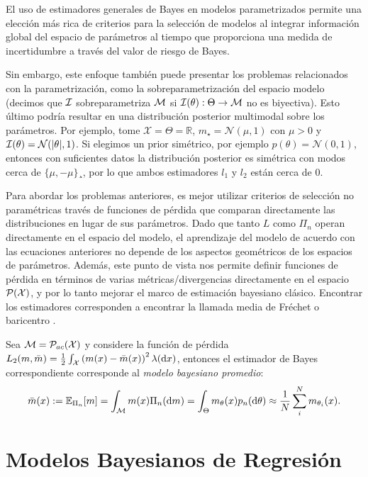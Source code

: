 El uso de estimadores generales de Bayes en modelos parametrizados permite una elección más rica de criterios para la selección de modelos al integrar información global del espacio de parámetros al tiempo que proporciona una medida de incertidumbre a través del valor de riesgo de Bayes. 

Sin embargo, este enfoque también puede presentar los problemas relacionados con la parametrización, como la sobreparametrización del espacio modelo (decimos que \(\mathcal{I}\) sobreparametriza \(\mathcal{M}\) si \(\mathcal{I}(\theta):\Theta \to \mathcal{M}\) no es biyectiva). Esto último podría resultar en una distribución posterior multimodal sobre los parámetros. Por ejemplo, tome \(\mathcal{X}=\Theta = \mathbb{R}\), \(m_\star=\mathcal{N}(\mu,1)\) con \(\mu > 0 \) y \(\mathcal{I}(\theta)=\mathcal{N}(|\theta|, 1)\). Si elegimos un prior simétrico, por ejemplo \(p(\theta)=\mathcal{N}(0,1)\), entonces con suficientes datos la distribución posterior es simétrica con modos cerca de \(\{\mu,-\mu\}¸\), por lo que ambos estimadores \(l_{1}\) y \(l_{2}\) están cerca de \(0\).

Para abordar los problemas anteriores, es mejor utilizar criterios de selección no paramétricas través de funciones de pérdida que comparan directamente las distribuciones en lugar de sus parámetros. Dado que tanto \(L\) como \(\Pi_n\) operan directamente en el espacio del modelo, el aprendizaje del modelo de acuerdo con las ecuaciones anteriores no depende de los aspectos geométricos de los espacios de parámetros. Además, este punto de vista nos permite definir funciones de pérdida en términos de varias métricas/divergencias directamente en el espacio \(\mathcal{P}(\mathcal{X})\), y por lo tanto mejorar el marco de estimación bayesiano clásico. Encontrar los estimadores corresponden a encontrar la llamada media de Fréchet o baricentro \cite{panaretos2017frechet}.

Sea \(\mathcal{M} = \mathcal{P}_{ac}(\mathcal{X})\) y considere la función de pérdida \(L_{2}(m,\bar{m}) = \frac{1}{2}\int_{\mathcal{X}}\left( m(x)-\bar{m}(x)\right) ^{2}\lambda (\dd x)\), entonces el estimador de Bayes correspondiente corresponde al \emph{modelo bayesiano promedio}:
\begin{align*}
	\label{eq:model_average}
	\bar{m}(x) := \mathbb{E}_{\Pi_n}[m] = \int_{\mathcal{M}}m(x)\Pi_n(\dd m) = \int_{\Theta}m_\theta(x)p_n(\dd \theta) \approx \frac{1}{N}\sum_i^N m_{\theta_i}(x).
\end{align*}


\section{Modelos Bayesianos de Regresión}

